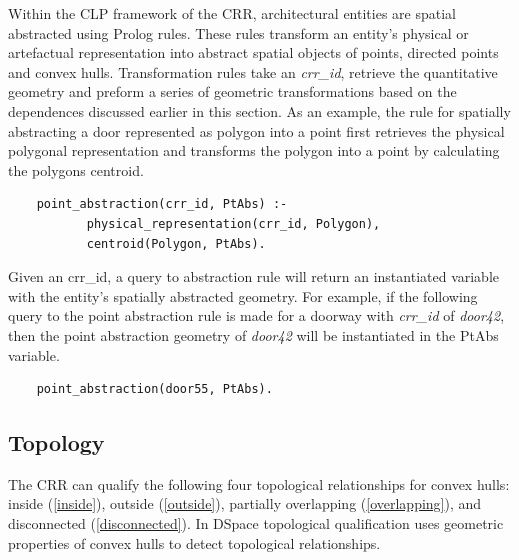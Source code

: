 \documentclass[12pt]{ucthesis}
\begin{document}
Within the CLP framework of the CRR, architectural entities are spatial abstracted using Prolog rules. These rules transform an entity's physical or artefactual representation into abstract spatial objects of points, directed points and convex hulls. Transformation rules take an \emph{crr\_id}, retrieve the quantitative geometry and preform a series of geometric transformations based on the dependences discussed earlier in this section. As an example, the rule for spatially abstracting a door represented as polygon into a point first retrieves the physical polygonal representation and transforms the polygon into a point by calculating the polygons centroid. 
\begin{verbatim}
    point_abstraction(crr_id, PtAbs) :-
           physical_representation(crr_id, Polygon),
           centroid(Polygon, PtAbs).
\end{verbatim} Given an crr\_id, a query to abstraction rule will return an instantiated variable with the entity's spatially abstracted geometry. For example, if the following query to the point abstraction rule is made for a doorway with \emph{crr\_id} of \emph{door42}, then the point abstraction geometry of \emph{door42} will be instantiated in the PtAbs variable.
\begin{verbatim}
    point_abstraction(door55, PtAbs).
\end{verbatim}





\subsection{Topology}
The CRR can qualify the following four topological relationships for convex hulls: inside (\ref{inside}), outside (\ref{outside}), partially overlapping (\ref{overlapping}), and disconnected (\ref{disconnected}). In DSpace topological qualification uses geometric properties of convex hulls to detect topological relationships. 
\end{document}
